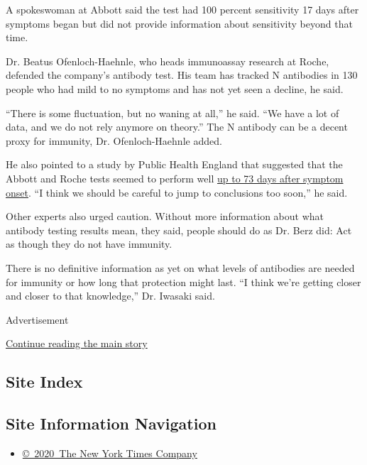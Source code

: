 A spokeswoman at Abbott said the test had 100 percent sensitivity 17
days after symptoms began but did not provide information about
sensitivity beyond that time.

Dr. Beatus Ofenloch-Haehnle, who heads immunoassay research at Roche,
defended the company's antibody test. His team has tracked N antibodies
in 130 people who had mild to no symptoms and has not yet seen a
decline, he said.

``There is some fluctuation, but no waning at all,'' he said. ``We have
a lot of data, and we do not rely anymore on theory.'' The N antibody
can be a decent proxy for immunity, Dr. Ofenloch-Haehnle added.

He also pointed to a study by Public Health England that suggested that
the Abbott and Roche tests seemed to perform well
\href{https://assets.publishing.service.gov.uk/government/uploads/system/uploads/attachment_data/file/898437/Evaluation__of_sensitivity_and_specificity_of_4_commercially_available_SARS-CoV-2_antibody_immunoassays.pdf}{up
to 73 days after symptom onset}. ``I think we should be careful to jump
to conclusions too soon,'' he said.

Other experts also urged caution. Without more information about what
antibody testing results mean, they said, people should do as Dr. Berz
did: Act as though they do not have immunity.

There is no definitive information as yet on what levels of antibodies
are needed for immunity or how long that protection might last. ``I
think we're getting closer and closer to that knowledge,'' Dr. Iwasaki
said.

Advertisement

\protect\hyperlink{after-bottom}{Continue reading the main story}

\hypertarget{site-index}{%
\subsection{Site Index}\label{site-index}}

\hypertarget{site-information-navigation}{%
\subsection{Site Information
Navigation}\label{site-information-navigation}}

\begin{itemize}
\tightlist
\item
  \href{https://help.nytimes.com/hc/en-us/articles/115014792127-Copyright-notice}{©~2020~The
  New York Times Company}
\end{itemize}

